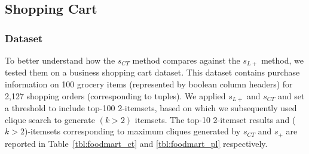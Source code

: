 

\subsection{Shopping Cart}
\subsubsection{Dataset}
To better understand how the $s_{CT}$ method compares against the $s_{L+}$ method, we tested them on a business shopping cart dataset.  This dataset contains purchase information on 100 grocery items (represented by boolean column headers) for 2,127 shopping orders (corresponding to tuples). We applied $s_{L+}$ and $s_{CT}$ and set a threshold to include top-100 2-itemsets, based on which we subsequently used clique search to generate $(k>2)$ itemsets. The top-10 2-itemset results and ($k>2$)-itemsets corresponding to maximum cliques generated by $s_{CT}$ and $s_{+}$ are reported in Table~\ref{tbl:foodmart_ct} and \ref{tbl:foodmart_pl} respectively.

